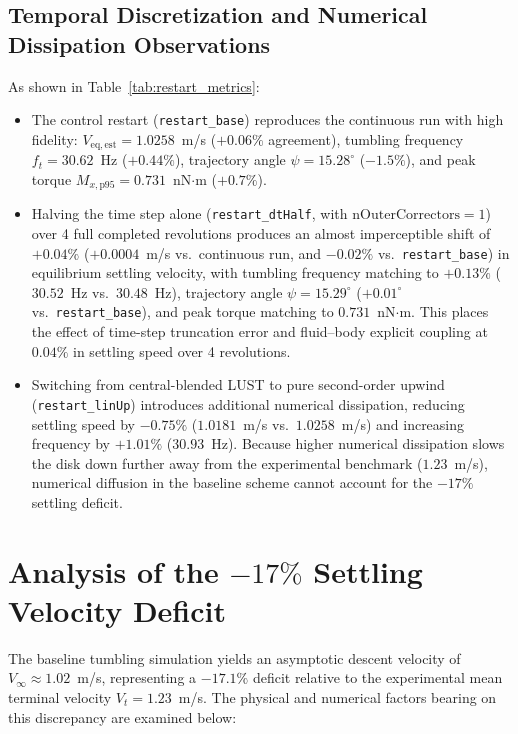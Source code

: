 \documentclass[11pt,a4paper]{article}
\begin{document}
\subsection{Temporal Discretization and Numerical Dissipation Observations}
As shown in Table~\ref{tab:restart_metrics}:
\begin{itemize}
    \item The control restart (\texttt{restart\_base}) reproduces the continuous run with high fidelity: $V_{\mathrm{eq,est}} = 1.0258$~m/s ($+0.06\%$ agreement), tumbling frequency $f_t = 30.62$~Hz ($+0.44\%$), trajectory angle $\psi = 15.28^\circ$ ($-1.5\%$), and peak torque $M_{x,\mathrm{p95}} = 0.731$~nN$\cdot$m ($+0.7\%$).
    \item Halving the time step alone (\texttt{restart\_dtHalf}, with $\mathrm{nOuterCorrectors} = 1$) over 4 full completed revolutions produces an almost imperceptible shift of $\mathbf{+0.04\%}$ ($+0.0004$~m/s vs.\ continuous run, and $-0.02\%$ vs.\ \texttt{restart\_base}) in equilibrium settling velocity, with tumbling frequency matching to $+0.13\%$ ($30.52$~Hz vs.\ $30.48$~Hz), trajectory angle $\psi = 15.29^\circ$ ($+0.01^\circ$ vs.\ \texttt{restart\_base}), and peak torque matching to $0.731$~nN$\cdot$m. This places the effect of time-step truncation error and fluid--body explicit coupling at $0.04\%$ in settling speed over 4 revolutions.
    \item Switching from central-blended LUST to pure second-order upwind (\texttt{restart\_linUp}) introduces additional numerical dissipation, reducing settling speed by $\mathbf{-0.75\%}$ ($1.0181$~m/s vs.\ $1.0258$~m/s) and increasing frequency by $+1.01\%$ ($30.93$~Hz). Because higher numerical dissipation slows the disk down further away from the experimental benchmark ($1.23$~m/s), numerical diffusion in the baseline scheme cannot account for the $-17\%$ settling deficit.
\end{itemize}

\section{Analysis of the \texorpdfstring{$-17\%$}{-17\%} Settling Velocity Deficit}

The baseline tumbling simulation yields an asymptotic descent velocity of $V_\infty \approx 1.02$~m/s, representing a $-17.1\%$ deficit relative to the experimental mean terminal velocity $V_t = 1.23$~m/s. The physical and numerical factors bearing on this discrepancy are examined below:
\end{document}
